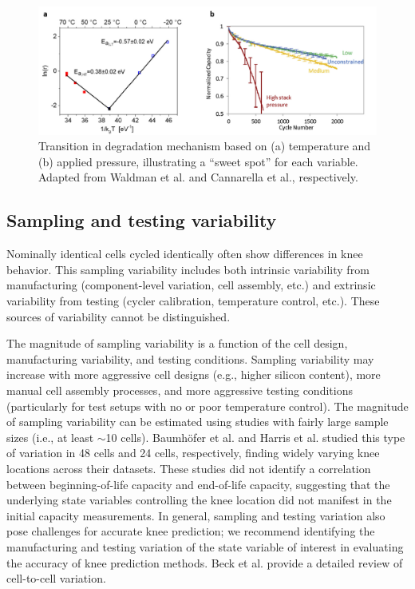 \documentclass[journal=jpcl, manuscript=article, layout=onecolumn]{achemso}
\begin{document}
\begin{figure}[ht]
\centering
\includegraphics[scale = 1.0]{images/Temperature_and_pressure.png}
\caption{Transition in degradation mechanism based on (a) temperature and (b) applied pressure, illustrating a ``sweet spot'' for each variable. Adapted from Waldman et al.\cite{waldmann_temperature_2014} and Cannarella et al.\cite{cannarella_stress_2014}, respectively.}
\label{fig:temperature_and_pressure}
\end{figure}



\subsection{Sampling and testing variability}

Nominally identical cells cycled identically often show differences in knee behavior. This sampling variability includes both intrinsic variability from manufacturing (component-level variation, cell assembly, etc.) and extrinsic variability from testing (cycler calibration, temperature control, etc.). These sources of variability cannot be distinguished.

The magnitude of sampling variability is a function of the cell design, manufacturing variability, and testing conditions. Sampling variability may increase with more aggressive cell designs (e.g., higher silicon content), more manual cell assembly processes, and more aggressive testing conditions (particularly for test setups with no or poor temperature control). The magnitude of sampling variability can be estimated using studies with fairly large sample sizes (i.e., at least $\sim$10 cells). Baumhöfer et al.\cite{baumhofer_production_2014} and Harris et al.\cite{harris_failure_2017} studied this type of variation in 48 cells and 24 cells, respectively, finding widely varying knee locations across their datasets. These studies did not identify a correlation between beginning-of-life capacity and end-of-life capacity, suggesting that the underlying state variables controlling the knee location did not manifest in the initial capacity measurements. In general, sampling and testing variation also pose challenges for accurate knee prediction; we recommend identifying the manufacturing and testing variation of the state variable of interest in evaluating the accuracy of knee prediction methods. Beck et al.\cite{beck_inhomogeneities_2021} provide a detailed review of cell-to-cell variation.
\end{document}
